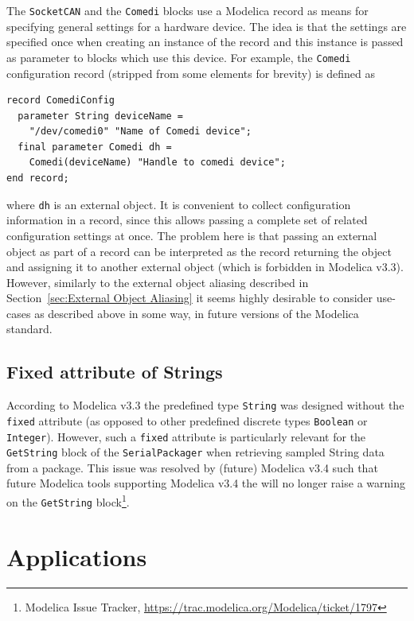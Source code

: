 \documentclass{resources/modelica}
\newcommand{\modelica}[1]{\lstinline[language=modelica]|#1|}
\begin{document}
The \modelica{SocketCAN} and the \modelica{Comedi} blocks use a Modelica record as means
for specifying general settings for a hardware device. The idea is that the
settings are specified once when creating an instance of the record and
this instance is passed as parameter to blocks which use this device. For
example, the \modelica{Comedi} configuration record (stripped from some elements for brevity) is defined
as
\begin{lstlisting}[language=modelica]
record ComediConfig
  parameter String deviceName =
    "/dev/comedi0" "Name of Comedi device";
  final parameter Comedi dh =
    Comedi(deviceName) "Handle to comedi device";
end record;
\end{lstlisting}
where \modelica{dh} is an external object. It is convenient to collect
configuration information in a record, since this allows passing a complete set
of related configuration settings at once. The problem here is that passing an
external object as part of a record can be interpreted as the record returning
the object and assigning it to another external object (which is forbidden in
Modelica v3.3). However, similarly to the external object aliasing described in
Section~\ref{sec:External Object Aliasing} it seems highly desirable to consider
use-cases as described above in some way,  in future versions of the Modelica
standard.

\subsection{Fixed attribute of Strings}

According to Modelica v3.3 the predefined type \mbox{\modelica{String}} was designed without the \modelica{fixed} attribute (as opposed to other predefined discrete types \modelica{Boolean} or \modelica{Integer}). However, such a \modelica{fixed} attribute is particularly relevant for the \modelica{GetString} block of the \modelica{SerialPackager} when retrieving sampled String data from a package. This issue was resolved by (future) Modelica v3.4 such that future Modelica tools supporting  Modelica v3.4  the will no longer raise a warning on the \modelica{GetString} block\footnote{Modelica Issue Tracker, \url{https://trac.modelica.org/Modelica/ticket/1797}}.


\section{Applications}
\label{sec:Applications}
\end{document}
